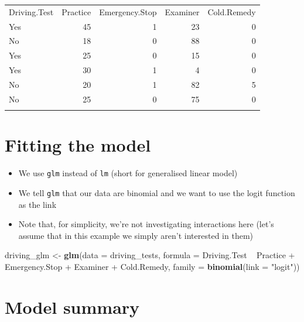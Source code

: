 \documentclass[]{article}
\newenvironment{Shaded}{}{}
\newcommand{\KeywordTok}[1]{\textcolor[rgb]{0.00,0.44,0.13}{\textbf{{#1}}}}
\newcommand{\DataTypeTok}[1]{\textcolor[rgb]{0.56,0.13,0.00}{{#1}}}
\newcommand{\StringTok}[1]{\textcolor[rgb]{0.25,0.44,0.63}{{#1}}}
\newcommand{\NormalTok}[1]{{#1}}
\begin{document}
\begin{longtable}[c]{@{}lrrrr@{}}
\toprule\addlinespace
Driving.Test & Practice & Emergency.Stop & Examiner & Cold.Remedy
\\\addlinespace
\midrule\endhead
Yes & 45 & 1 & 23 & 0
\\\addlinespace
No & 18 & 0 & 88 & 0
\\\addlinespace
Yes & 25 & 0 & 15 & 0
\\\addlinespace
Yes & 30 & 1 & 4 & 0
\\\addlinespace
No & 20 & 1 & 82 & 5
\\\addlinespace
No & 25 & 0 & 75 & 0
\\\addlinespace
\bottomrule
\end{longtable}

\section{Fitting the model}\label{fitting-the-model}

\begin{itemize}
\itemsep1pt\parskip0pt
\item
  We use \texttt{glm} instead of \texttt{lm} (short for generalised
  linear model)
\item
  We tell \texttt{glm} that our data are binomial and we want to use the
  logit function as the link
\item
  Note that, for simplicity, we're not investigating interactions here
  (let's assume that in this example we simply aren't interested in
  them)
\end{itemize}

\begin{Shaded}
\begin{Highlighting}[]
\NormalTok{driving_glm <-}\StringTok{ }\KeywordTok{glm}\NormalTok{(}\DataTypeTok{data =} \NormalTok{driving_tests, }\DataTypeTok{formula =} \NormalTok{Driving.Test ~}\StringTok{ }\NormalTok{Practice +}\StringTok{ }\NormalTok{Emergency.Stop +}\StringTok{ }\NormalTok{Examiner +}\StringTok{ }\NormalTok{Cold.Remedy, }\DataTypeTok{family =} \KeywordTok{binomial}\NormalTok{(}\DataTypeTok{link =} \StringTok{"logit"}\NormalTok{))}
\end{Highlighting}
\end{Shaded}

\section{Model summary}\label{model-summary}
\end{document}
